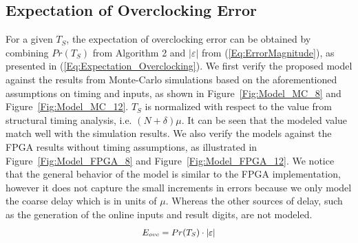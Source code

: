 \documentclass{acm_proc_article-sp}
\begin{document}
\subsection{Expectation of Overclocking Error}\label{Sec:MeanError}
For a given $T_S$, the expectation of overclocking error can be obtained by combining $Pr(T_S)$ from Algorithm 2 and $|\varepsilon|$ from (\ref{Eq:ErrorMagnitude}), as presented in (\ref{Eq:Expectation_Overclocking}). We first verify the proposed model against the results from Monte-Carlo simulations based on the aforementioned assumptions on timing and inputs, as shown in Figure~\ref{Fig:Model_MC_8} and Figure~\ref{Fig:Model_MC_12}. $T_S$ is normalized with respect to the value from structural timing analysis, i.e. $(N+\delta)\mu$. It can be seen that the modeled value match well with the simulation results. We also verify the models against the FPGA results without timing assumptions, as illustrated in Figure~\ref{Fig:Model_FPGA_8} and Figure~\ref{Fig:Model_FPGA_12}. We notice that the general behavior of the model is similar to the FPGA implementation, however it does not capture the small increments in errors because we only model the coarse delay which is in units of $\mu$. Whereas the other sources of delay, such as the generation of the online inputs and result digits, are not modeled.
%
\begin{eqnarray}\label{Eq:Expectation_Overclocking}
\scriptsize
  E_{ovc}=Pr(T_S)\cdot |\varepsilon|
\normalsize
\end{eqnarray}
\end{document}
